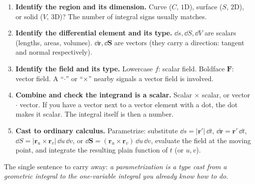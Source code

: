 \documentclass{essay}
\newcommand{\F}{\mathbf{F}}
\newcommand{\rr}{\mathbf{r}}
\begin{document}
\begin{enumerate}[leftmargin=1.6em]
\item \textbf{Identify the region and its dimension.} Curve ($C$, $1$D), surface
($S$, $2$D), or solid ($V$, $3$D)? The number of integral signs usually matches.
\item \textbf{Identify the differential element and its type.} $\dd s,\dd S,\dd V$
are scalars (lengths, areas, volumes). $\dd\mathbf{r},\dd\mathbf{S}$ are vectors
(they carry a direction: tangent and normal respectively).
\item \textbf{Identify the field and its type.} Lowercase $f$: scalar field.
Boldface $\F$: vector field. A ``$\cdot$'' or ``$\times$'' nearby signals a vector
field is involved.
\item \textbf{Combine and check the integrand is a scalar.} Scalar $\times$ scalar,
or vector $\cdot$ vector. If you have a vector next to a vector element with a dot,
the dot makes it scalar. The integral itself is then a number.
\item \textbf{Cast to ordinary calculus.} Parametrize: substitute
$\dd s=\lvert\rr'\rvert\,\dd t$, $\dd\mathbf{r}=\rr'\,\dd t$,
$\dd S=\lvert\rr_u\times\rr_v\rvert\,\dd u\,\dd v$, or
$\dd\mathbf{S}=(\rr_u\times\rr_v)\,\dd u\,\dd v$, evaluate the field at the moving
point, and integrate the resulting plain function of $t$ (or $u,v$).
\end{enumerate}

The single sentence to carry away: \emph{a parametrization is a type cast from a
geometric integral to the one-variable integral you already know how to do.}
\end{document}

